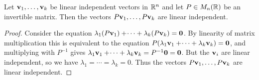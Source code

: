 \documentclass[10pt, a4paper]{article}
\begin{document}
\begin{lemma}\label{pre:linalg:lem:linindepvecmulmatrisindep}
    Let $\mathbf{v}_1, \dotsc, \mathbf{v}_k$ be linear independent vectors in $\mathbb{R} ^ n$ and let $P \in M_n(\mathbb{R})$ be an invertible matrix.
    Then the vectors $P\mathbf{v}_1, \dotsc,P\mathbf{v}_k$ are linear independent.
    \begin{proof}
        Consider the equation $\lambda_1(P\mathbf{v}_1) + \dotsi + \lambda_k(P\mathbf{v}_k) = \mathbf{0}$.
        By linearity of matrix multiplication this is equivalent to the equation $P(\lambda_1\mathbf{v}_1 + \dotsi + \lambda_k\mathbf{v}_k) = \mathbf{0}$,
        and multiplying with $P ^ {-1}$ gives $\lambda_1\mathbf{v}_1 + \dotsi + \lambda_k\mathbf{v}_k = P ^ {-1}\mathbf{0} = \mathbf{0}$.
        But the $\mathbf{v}_i$ are linear independent,
        so we have $\lambda_1 = \dotsi = \lambda_k = 0$.
        Thus the vectors $P\mathbf{v}_1, \dotsc, P\mathbf{v}_k$ are linear independent.
    \end{proof}
\end{lemma}
\end{document}
